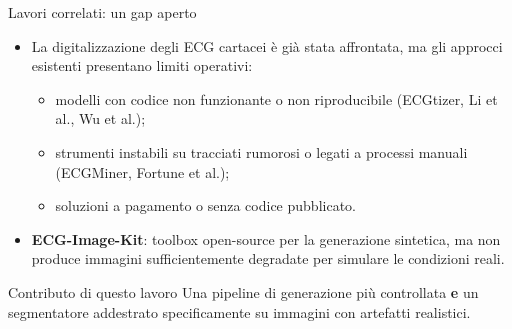 \documentclass[aspectratio=169,11pt]{beamer}
\begin{document}
\begin{frame}{Lavori correlati: un gap aperto}
  \begin{itemize}
    \item La digitalizzazione degli ECG cartacei è già stata affrontata, ma gli approcci esistenti presentano limiti operativi:
    \begin{itemize}
      \item modelli con codice \alert{non funzionante} o non riproducibile (ECGtizer, Li et al., Wu et al.);
      \item strumenti \alert{instabili} su tracciati rumorosi o legati a processi manuali (ECGMiner, Fortune et al.);
      \item soluzioni \alert{a pagamento} o senza codice pubblicato.
    \end{itemize}
    \item \textbf{ECG-Image-Kit}: toolbox open-source per la generazione sintetica, ma non produce immagini sufficientemente \alert{degradate} per simulare le condizioni reali.
  \end{itemize}
  \vspace{2mm}
  \begin{block}{Contributo di questo lavoro}
    Una pipeline di generazione più controllata \textbf{e} un segmentatore addestrato specificamente su immagini con artefatti realistici.
  \end{block}
\end{frame}
\end{document}
